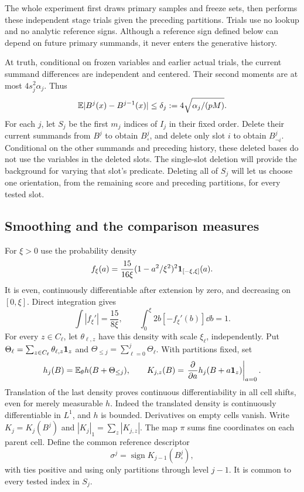 The whole experiment first draws primary samples and freeze sets, then
performs these independent stage trials given the preceding partitions.
Trials use no lookup and no analytic reference signs. Although a
reference sign defined below can depend on future primary summands,
it never enters the generative history.

At truth, conditional on frozen variables and earlier actual trials,
the current summand differences are independent and centered. Their
second moments are at most $4s_j^2\alpha_j$. Thus
\begin{equation}\label{eq:replacement-truth}
 \mathbb E|B^j(x)-B^{j-1}(x)|
 \le\delta_j:=4\sqrt{\alpha_j/(pM)}.
\end{equation}
For each $j$, let $S_j$ be the first $m_j$ indices of $I_j$ in their
fixed order. Delete their current summands from $B^j$ to obtain
$B_\circ^j$, and delete only slot $i$ to obtain $B^j_{\neg i}$.
Conditional on the other summands and preceding history, these deleted
bases do not use the variables in the deleted slots.
The single-slot deletion will provide the background for varying that
slot's predicate. Deleting all of $S_j$ will let us choose one orientation,
from the remaining score and preceding partitions, for every tested slot.

\subsection{Smoothing and the comparison measures}

For $\xi>0$ use the probability density
\[
 f_\xi(a)=\frac{15}{16\xi}(1-a^2/\xi^2)^2\mathbf 1_{[-\xi,\xi]}(a).
\]
It is even, continuously differentiable after extension by zero, and
decreasing on $[0,\xi]$. Direct integration gives
\begin{equation}\label{eq:density-identities}
 \int|f_\xi'|=\frac{15}{8\xi},\qquad
 \int_0^\xi 2b[-f_\xi'(b)]\dd b=1.
\end{equation}
For every $z\in C_\ell$, let $\theta_{\ell,z}$ have this density with
scale $\xi_\ell$, independently. Put
$\Theta_\ell=\sum_{z\in C_\ell}\theta_{\ell,z}\mathbf 1_z$ and
$\Theta_{\le j}=\sum_{\ell=0}^j\Theta_\ell$. With partitions fixed, set
\[
 h_j(B)=\mathbb E_\theta h(B+\Theta_{\le j}),\qquad
 K_{j,z}(B)=\left.\frac{\partial}{\partial a}
                   h_j(B+a\mathbf 1_z)\right|_{a=0}.
\]
Translation of the last density proves continuous differentiability in
all cell shifts, even for merely measurable $h$. Indeed the translated
density is continuously differentiable in $L^1$, and $h$ is bounded.
Derivatives on empty cells vanish. Write $K_j=K_j(B^j)$ and
$|K_j|_1=\sum_z|K_{j,z}|$. The map $\pi$ sums fine coordinates on each
parent cell. Define the common reference descriptor
\begin{equation}\label{eq:reference-sign}
 \sigma^j=\operatorname{sign}K_{j-1}(B_\circ^j),
\end{equation}
with ties positive and using only partitions through level $j-1$.
It is common to every tested index in $S_j$.

